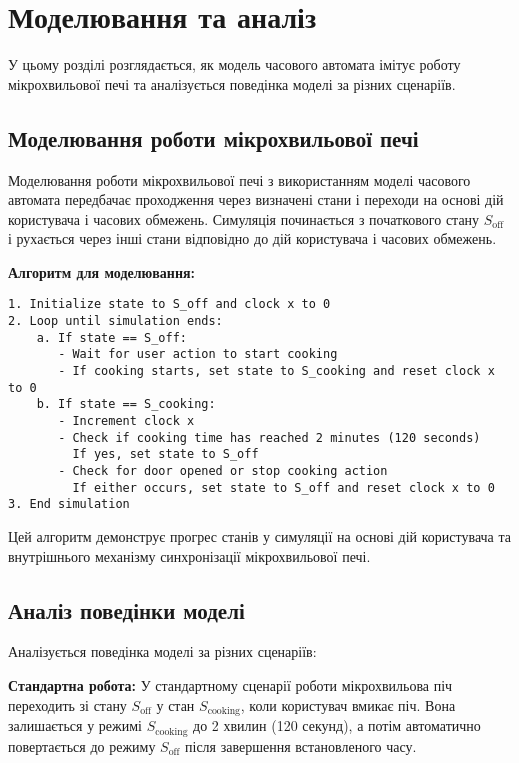 \documentclass[12pt,a4paper]{article}
\begin{document}
\section{Моделювання та аналіз}

У цьому розділі розглядається, як модель часового автомата імітує роботу мікрохвильової печі та аналізується поведінка моделі за різних сценаріїв.

\subsection{Моделювання роботи мікрохвильової печі}
Моделювання роботи мікрохвильової печі з використанням моделі часового автомата передбачає проходження через визначені стани і переходи на основі дій користувача і часових обмежень. Симуляція починається з початкового стану \( S_{\text{off}} \) і рухається через інші стани відповідно до дій користувача і часових обмежень.

\vspace{0.5cm}

\textbf{Алгоритм для моделювання:}
\begin{verbatim}
1. Initialize state to S_off and clock x to 0
2. Loop until simulation ends:
    a. If state == S_off:
       - Wait for user action to start cooking
       - If cooking starts, set state to S_cooking and reset clock x to 0
    b. If state == S_cooking:
       - Increment clock x
       - Check if cooking time has reached 2 minutes (120 seconds)
         If yes, set state to S_off
       - Check for door opened or stop cooking action
         If either occurs, set state to S_off and reset clock x to 0
3. End simulation
\end{verbatim}


Цей алгоритм демонструє прогрес станів у симуляції на основі дій користувача та внутрішнього механізму синхронізації мікрохвильової печі.

\subsection{Аналіз поведінки моделі}
Аналізується поведінка моделі за різних сценаріїв:

\textbf{Стандартна робота:}
У стандартному сценарії роботи мікрохвильова піч переходить зі стану \( S_{\text{off}} \) у стан \( S_{\text{cooking}} \), коли користувач вмикає піч. Вона залишається у режимі \( S_{\text{cooking}} \) до 2 хвилин (120 секунд), а потім автоматично повертається до режиму \( S_{\text{off}} \) після завершення встановленого часу.
\end{document}
